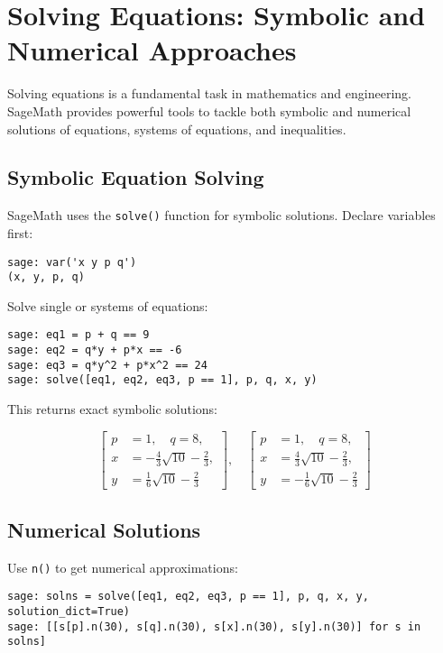 \documentclass[12pt]{book}
\begin{document}
\chapter{Solving Equations: Symbolic and Numerical Approaches}

Solving equations is a fundamental task in mathematics and engineering. SageMath provides powerful tools to tackle both symbolic and numerical solutions of equations, systems of equations, and inequalities.

\section{Symbolic Equation Solving}

SageMath uses the \texttt{solve()} function for symbolic solutions. Declare variables first:

\begin{verbatim}
sage: var('x y p q')
(x, y, p, q)
\end{verbatim}

Solve single or systems of equations:

\begin{verbatim}
sage: eq1 = p + q == 9
sage: eq2 = q*y + p*x == -6
sage: eq3 = q*y^2 + p*x^2 == 24
sage: solve([eq1, eq2, eq3, p == 1], p, q, x, y)
\end{verbatim}

This returns exact symbolic solutions:

\[
\left[
\begin{aligned}
p &= 1, \quad q = 8, \\
x &= -\frac{4}{3}\sqrt{10} - \frac{2}{3}, \\
y &= \frac{1}{6}\sqrt{10} - \frac{2}{3}
\end{aligned}
\right],
\quad
\left[
\begin{aligned}
p &= 1, \quad q = 8, \\
x &= \frac{4}{3}\sqrt{10} - \frac{2}{3}, \\
y &= -\frac{1}{6}\sqrt{10} - \frac{2}{3}
\end{aligned}
\right]
\]

\section{Numerical Solutions}

Use \texttt{n()} to get numerical approximations:

\begin{verbatim}
sage: solns = solve([eq1, eq2, eq3, p == 1], p, q, x, y, solution_dict=True)
sage: [[s[p].n(30), s[q].n(30), s[x].n(30), s[y].n(30)] for s in solns]
\end{verbatim}
\end{document}
